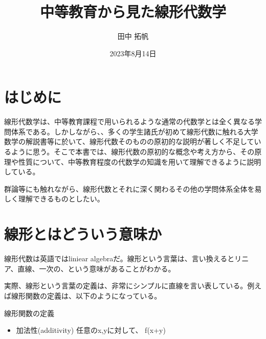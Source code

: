 \documentclass[a4j]{jsarticle}
\title{中等教育から見た線形代数学}
\author{田中 拓帆}
\date{2023年8月14日}
\begin{document}
	\maketitle
	\section{はじめに}
	線形代数学は、中等教育課程で用いられるような通常の代数学とは全く異なる学問体系である。しかしながら、、多くの学生諸氏が初めて線形代数に触れる大学数学の解説書等に於いて、線形代数そのものの原初的な説明が著しく不足しているように思う。そこで本書では、線形代数の原初的な概念や考え方から、その原理や性質について、中等教育程度の代数学の知識を用いて理解できるように説明している。
	
	群論等にも触れながら、線形代数とそれに深く関わるその他の学問体系全体を易しく理解できるものとしたい。
	\section{線形とはどういう意味か}
	線形代数は英語ではliniear algebraだ。線形という言葉は、言い換えるとリニア、直線、一次の、という意味があることがわかる。
	
	実際、線形という言葉の定義は、非常にシンプルに直線を言い表している。例えば線形関数の定義は、以下のようになっている。
	\begin{itembox}[l]{線形関数の定義}
		\begin{itemize}
			\item 加法性(additivity) 任意のx,yに対して、 f(x+y)

		\end{itemize}
	\end{itembox}
\end{document}
